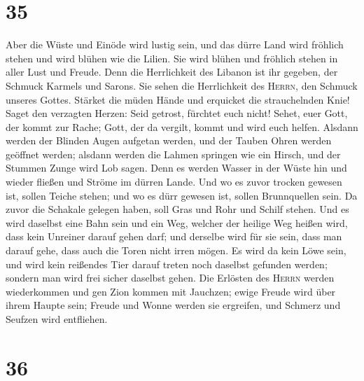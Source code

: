 \hypertarget{section-34}{%
\section{35}\label{section-34}}

 Aber die Wüste und Einöde wird lustig sein, und das dürre
Land wird fröhlich stehen und wird blühen wie die Lilien. 
Sie wird blühen und fröhlich stehen in aller Lust und Freude. Denn die
Herrlichkeit des Libanon ist ihr gegeben, der Schmuck Karmels und
Sarons. Sie sehen die Herrlichkeit des \textsc{Herrn}, den Schmuck
unseres Gottes.  Stärket die müden Hände und erquicket die
strauchelnden Knie!  Saget den verzagten Herzen: Seid
getrost, fürchtet euch nicht! Sehet, euer Gott, der kommt zur Rache;
Gott, der da vergilt, kommt und wird euch helfen.  Alsdann
werden der Blinden Augen aufgetan werden, und der Tauben Ohren werden
geöffnet werden;  alsdann werden die Lahmen springen wie
ein Hirsch, und der Stummen Zunge wird Lob sagen. Denn es werden Wasser
in der Wüste hin und wieder fließen und Ströme im dürren Lande.
 Und wo es zuvor trocken gewesen ist, sollen Teiche
stehen; und wo es dürr gewesen ist, sollen Brunnquellen sein. Da zuvor
die Schakale gelegen haben, soll Gras und Rohr und Schilf stehen.
 Und es wird daselbst eine Bahn sein und ein Weg, welcher
der heilige Weg heißen wird, dass kein Unreiner darauf gehen darf; und
derselbe wird für sie sein, dass man darauf gehe, dass auch die Toren
nicht irren mögen.  Es wird da kein Löwe sein, und wird
kein reißendes Tier darauf treten noch daselbst gefunden werden; sondern
man wird frei sicher daselbst gehen.  Die Erlösten des
\textsc{Herrn} werden wiederkommen und gen Zion kommen mit Jauchzen;
ewige Freude wird über ihrem Haupte sein; Freude und Wonne werden sie
ergreifen, und Schmerz und Seufzen wird entfliehen.

\hypertarget{section-35}{%
\section{36}\label{section-35}}

